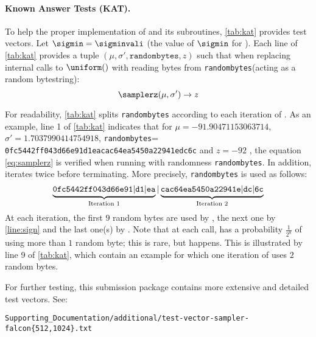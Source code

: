 
\newcommand{\randombytes}{\texttt{randombytes}\xspace}

\paragraph{Known Answer Tests (KAT).} To help the proper implementation of \longsamplerz and its subroutines, \cref{tab:kat} provides test vectors. Let $\sigmin = \sigminvali$ (the value of $\sigmin$ for ). Each line of \cref{tab:kat} provides a tuple $(\mu, \sigma', \randombytes, z)$ such that when replacing internal calls to $\uniform()$ with reading bytes from \randombytes (acting as a random bytestring):
\begin{equation}\label{eq:samplerz}
	 \samplerz(\mu, \sigma') \rightarrow z
\end{equation}

For readability, \cref{tab:kat} splits \randombytes according to each iteration of \samplerz. As an example, line 1 of \cref{tab:kat} indicates that for $\mu = -91.90471153063714$, $\sigma' = 1.7037990414754918$, \randombytes = {\small \texttt{0fc5442ff043d66e91d1eacac64ea5450a22941edc6c}} and $z = -92$ , the equation \eqref{eq:samplerz} is verified when running \samplerz with randomness \randombytes. In addition, \samplerz iterates twice before terminating. More precisely, \randombytes is used as follows:
\[
\underbrace{\tt 0fc5442ff043d66e91|d1|ea}_{\text{Iteration 1}}|
\underbrace{\tt cac64ea5450a22941e|dc|6c}_{\text{Iteration 2}}
\]
At each iteration, the first $9$ random bytes are used by \basesampler, the next one by \cref{line:sign} and the last one(s) by \berexp. Note that at each call, \berexp has a probability $\frac{1}{2^8}$ of using more than $1$ random byte; this is rare, but happens. This is illustrated by line 9 of \cref{tab:kat}, which contain an example for which one iteration of \berexp uses $2$ random bytes.

For further testing, this submission package contains more extensive and detailed test vectors. See:
\vspace{-4mm}
\begin{center}
{\small\tt Supporting\_Documentation/additional/test-vector-sampler-falcon\{512,1024\}.txt}
\end{center}



